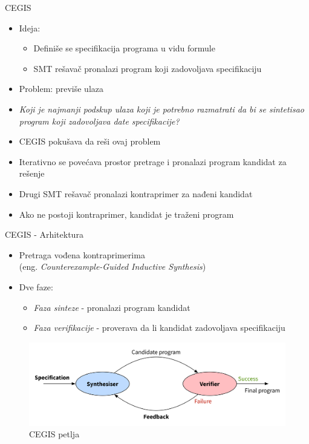 
\begin{frame}{CEGIS}
    \begin{itemize}
		\item Ideja:
			\begin{itemize}
				\item Definiše se specifikacija programa u vidu formule
		    	\item SMT rešavač pronalazi program koji zadovoljava specifikaciju
			\end{itemize}    	
    	\item Problem: previše ulaza 
        \item \emph{Koji je najmanji podskup ulaza koji je potrebno razmatrati da bi se sintetisao program koji zadovoljava date specifikacije?}
        \item CEGIS pokušava da reši ovaj problem
        \item Iterativno se povećava prostor pretrage i pronalazi program kandidat za rešenje
        \item Drugi SMT rešavač pronalazi kontraprimer za nađeni kandidat
		\item Ako ne postoji kontraprimer, kandidat je traženi program
    \end{itemize}
\end{frame}

\begin{frame}[fragile]{CEGIS - Arhitektura}
    \begin{itemize}
    	\item Pretraga vođena kontraprimerima \\(eng. \emph{Counterexample-Guided Inductive Synthesis})
        \item Dve faze: 
        	\begin{itemize}
        		\item \emph{Faza sinteze} - pronalazi program kandidat
        		\item \emph{Faza verifikacije} - proverava da li kandidat zadovoljava specifikaciju 
        	\end{itemize}
    \end{itemize}
    \begin{figure}
        \begin{center}
            \includegraphics[scale=0.4]{../resources/cegis.png}
        \end{center}
        \caption{CEGIS petlja}
    \end{figure}
\end{frame}

